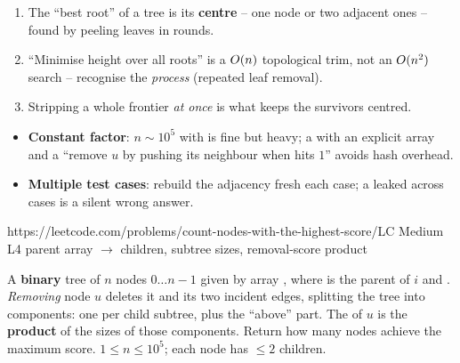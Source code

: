 \begin{insightbox}
\begin{enumerate}[nosep, leftmargin=1.6em]
  \item The ``best root'' of a tree is its \textbf{centre} -- one node or two adjacent ones --
        found by peeling leaves in rounds.
  \item ``Minimise height over all roots'' is a $O(n)$ topological trim, not an
        $O(n^2)$ search -- recognise the \emph{process} (repeated leaf removal).
  \item Stripping a whole frontier \emph{at once} is what keeps the survivors centred.
\end{enumerate}
\end{insightbox}

\begin{hardeningbox}
\begin{itemize}[nosep, leftmargin=1.4em]
  \item \textbf{Constant factor}: $n\sim10^5$ with  is fine
        but heavy; a  with an explicit  array and a
        ``remove $u$ by pushing its neighbour when  hits $1$'' avoids hash overhead.
  \item \textbf{Multiple test cases}: rebuild the adjacency fresh each case; a leaked
         across cases is a silent wrong answer.
\end{itemize}
\end{hardeningbox}

  {https://leetcode.com/problems/count-nodes-with-the-highest-score/}{LC Medium L4}
  {parent array $\to$ children, subtree sizes, removal-score product}

\begin{problemstatement}
A \textbf{binary} tree of $n$ nodes $0\dots n-1$ given by array , where
 is the parent of $i$ and . \emph{Removing} node
$u$ deletes it and its two incident edges, splitting the tree into components: one per child
subtree, plus the ``above'' part. The  of $u$ is the \textbf{product} of the
sizes of those components. Return how many nodes achieve the maximum score.
$1 \le n \le 10^5$; each node has $\le 2$ children.
\end{problemstatement}

